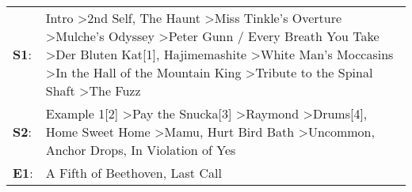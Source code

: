 \begin{supertabular}{p{0.03\textwidth}p{0.92\textwidth}}
 \textbf{S1}:  &  Intro\textsuperscript{} \textgreater \enspace 2nd Self\textsuperscript{}, \enspace The Haunt\textsuperscript{} \textgreater \enspace Miss Tinkle's Overture\textsuperscript{} \textgreater \enspace Mulche's Odyssey\textsuperscript{} \textgreater \enspace Peter Gunn / Every Breath You Take\textsuperscript{} \textgreater \enspace Der Bluten Kat[1]\textsuperscript{}, \enspace Hajimemashite\textsuperscript{} \textgreater \enspace White Man's Moccasins\textsuperscript{} \textgreater \enspace In the Hall of the Mountain King\textsuperscript{} \textgreater \enspace Tribute to the Spinal Shaft\textsuperscript{} \textgreater \enspace The Fuzz\textsuperscript{}  \enspace  \\
 \textbf{S2}:  &                                                                                                                                                                                                            Example 1[2]\textsuperscript{} \textgreater \enspace Pay the Snucka[3]\textsuperscript{} \textgreater \enspace Raymond\textsuperscript{} \textgreater \enspace Drums[4]\textsuperscript{}, \enspace Home Sweet Home\textsuperscript{} \textgreater \enspace Mamu\textsuperscript{}, \enspace Hurt Bird Bath\textsuperscript{} \textgreater \enspace Uncommon\textsuperscript{}, \enspace Anchor Drops\textsuperscript{}, \enspace In Violation of Yes\textsuperscript{}  \enspace  \\
 \textbf{E1}:  &                                                                                                                                                                                                                                                                                                                                                                                                                                                                                                                                                                                                       A Fifth of Beethoven\textsuperscript{}, \enspace Last Call\textsuperscript{}  \enspace  \\
\end{supertabular}
